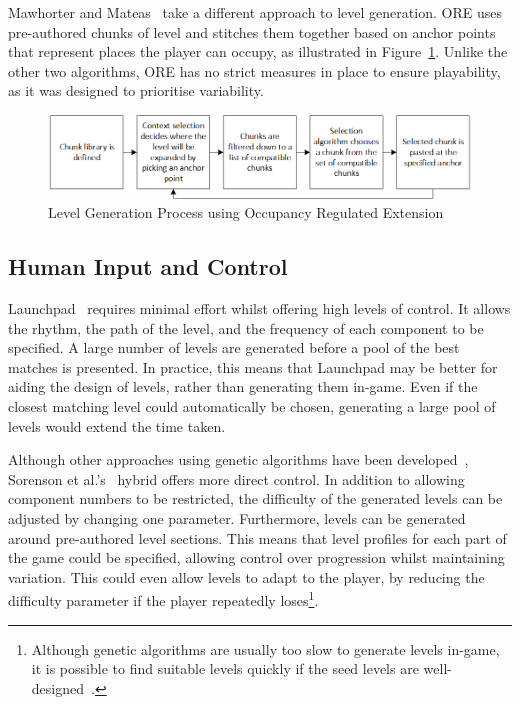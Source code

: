 \documentclass{scrartcl}
\begin{document}
Mawhorter and Mateas~\cite{mawhorter:occupancy} take a different approach to level generation. ORE uses pre-authored chunks of level and stitches them together based on anchor points that represent places the player can occupy, as illustrated in Figure~\ref{fig:ore}. Unlike the other two algorithms, ORE has no strict measures in place to ensure playability, as it was designed to prioritise variability.
\begin{figure}[h]
\includegraphics[width=\textwidth]{figs/ore.png}
\caption{Level Generation Process using Occupancy Regulated Extension}
\label{fig:ore}
\end{figure}


\subsection{Human Input and Control}
Launchpad~\cite{smith:launchpad} requires minimal effort whilst offering high levels of control. It allows the rhythm, the path of the level, and the frequency of each component to be specified. A large number of levels are generated before a pool of the best matches is presented. In practice, this means that Launchpad may be better for aiding the design of levels, rather than generating them in-game. Even if the closest matching level could automatically be chosen, generating a large pool of levels would extend the time taken.
 
Although other approaches using genetic algorithms have been developed~\cite{mourato:genetic}, Sorenson et al.'s~\cite{sorenson:generic} hybrid offers more direct control. In addition to allowing component numbers to be restricted, the difficulty of the generated levels can be adjusted by changing one parameter. Furthermore, levels can be generated around pre-authored level sections. This means that level profiles for each part of the game could be specified, allowing control over progression whilst maintaining variation. This could even allow levels to adapt to the player, by reducing the difficulty parameter if the player repeatedly loses\footnote{Although genetic algorithms are usually too slow to generate levels in-game, it is possible to find suitable levels quickly if the seed levels are well-designed~\cite{shaker:mario}.}.
\end{document}
